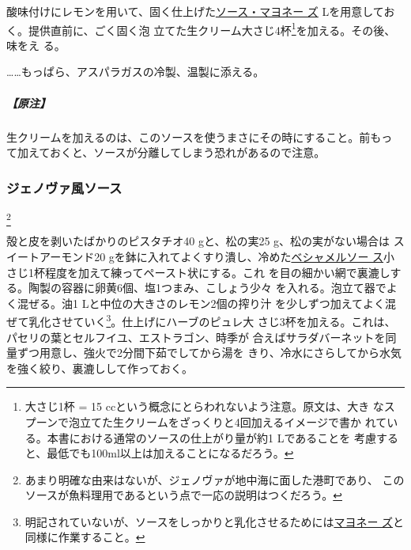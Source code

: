 \begin{recette}
酸味付けにレモンを用いて、固く仕上げた\protect\hyperlink{mayonnaise}{ソース・マヨネー
ズ}\troisquarts{} Lを用意しておく。提供直前に、ごく固く泡
立てた生クリーム大さじ4杯\footnote{大さじ1杯 = 15
  ccという概念にとらわれないよう注意。原文は、大き
  なスプーンで泡立てた生クリームをざっくりと4回加えるイメージで書か
  れている。本書における通常のソースの仕上がり量が約1 Lであることを
  考慮すると、最低でも100ml以上は加えることになるだろう。}を加える。その後、味をえ
る。

\ldots{}\ldots{}もっぱら、アスパラガスの冷製、温製に添える。

\hypertarget{nota-sauce-chantilly-froide}{%
\subparagraph{【原注】}\label{nota-sauce-chantilly-froide}}

生クリームを加えるのは、このソースを使うまさにその時にすること。前もっ
て加えておくと、ソースが分離してしまう恐れがあるので注意。

\maeaki

\hypertarget{sauce-genoise-froids}{%
\subsubsection{ジェノヴァ風ソース}\label{sauce-genoise-froids}}

\footnote{あまり明確な由来はないが、ジェノヴァが地中海に面した港町であり、
  このソースが魚料理用であるという点で一応の説明はつくだろう。}


殻と皮を剥いたばかりのピスタチオ40 gと、松の実25 g、松の実がない場合は
スイートアーモンド20
gを鉢に入れてよくすり潰し、冷めた\protect\hyperlink{sauce-bechamel}{ベシャメルソー
ス}小さじ1杯程度を加えて練ってペースト状にする。これ
を目の細かい網で裏漉しする。陶製の容器に卵黄6個、塩1つまみ、こしょう少々
を入れる。泡立て器でよく混ぜる。油1 Lと中位の大きさのレモン2個の搾り汁
を少しずつ加えてよく混ぜて乳化させていく\footnote{明記されていないが、ソースをしっかりと乳化させるためには\protect\hyperlink{mayonnaise}{マヨネー
  ズ}と同様に作業すること。}。仕上げにハーブのピュレ大
さじ3杯を加える。これは、パセリの葉とセルフイユ、エストラゴン、時季が
合えばサラダバーネットを同量ずつ用意し、強火で2分間下茹でしてから湯を
きり、冷水にさらしてから水気を強く絞り、裏漉しして作っておく。


\end{recette}
